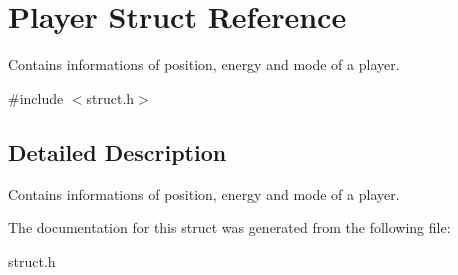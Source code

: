 \hypertarget{struct_player}{}\section{Player Struct Reference}
\label{struct_player}


Contains informations of position, energy and mode of a player.  




{\ttfamily \#include $<$struct.\+h$>$}



\subsection{Detailed Description}
Contains informations of position, energy and mode of a player. 

The documentation for this struct was generated from the following file\+:\begin{DoxyCompactItemize}
\item 
struct.\+h\end{DoxyCompactItemize}
